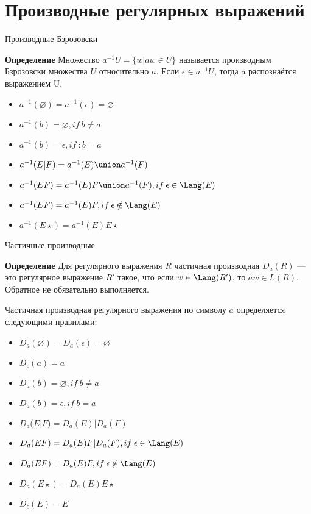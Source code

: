\section{Производные регулярных выражений}
\begin{frame}{Производные Бзрозовски}
    \vspace{-5pt}
    \begin{block}{\bf Определение}
    Множество $a^{-1} U = \{w | aw \in U\}$ называется производным Бзрозовски множества $U$ относительно $a$. Если $\epsilon \in a^{-1} U$, тогда a распознаётся выражением U.
    \end{block}
    \begin{itemize}
        \item $a^{-1}(\varnothing) = a^{-1}(\epsilon) = \varnothing$
        \item $a^{-1}(b) = \varnothing, if\:b \neq a$
        \item $a^{-1}(b) = \epsilon, if\ :b = a$
        \item $a^{-1}(E|F) = a^{-1}(E) \union a^{-1}(F)$
        \item $a^{-1}(EF) = a^{-1}(E)F \union a^{-1}(F), if \: \epsilon \in \Lang(E)$
        \item $a^{-1}(EF) = a^{-1}(E)F, if \: \epsilon \notin \Lang(E)$
        \item $a^{-1}(E \star ) = a^{-1}(E) E \star$
    \end{itemize}
\end{frame}
\begin{frame}{Частичные производные}
    \begin{block}{\bf Определение}
    Для регулярного выражения $R$ частичная производная $D_a(R)$ — это регулярное выражение $R'$ такое, что если $w \in \Lang(R')$, то $aw \in L(R)$. Обратное не обязательно выполняется.
    \end{block}
    Частичная производная регулярного выражения по символу $a$ определяется следующими правилами:
    \begin{itemize}
        \item $D_a(\varnothing) = D_a(\epsilon) = \varnothing$
        \item $D_\epsilon(a) = a$
        \item $D_a(b) = \varnothing, if\:b \neq a$
        \item $D_a(b) = \epsilon, if\:b = a$
        \item $D_a(E | F) = D_a(E) | D_a(F)$
        \item $D_a(EF) = D_a(E)F | D_a(F), if \: \epsilon \in \Lang(E)$
        \item $D_a(EF) = D_a(E)F, if \: \epsilon \notin \Lang(E)$
        \item $D_a(E \star ) = D_a(E) E \star$
        \item $D_\epsilon(E) = E$
    \end{itemize}
\end{frame} %
